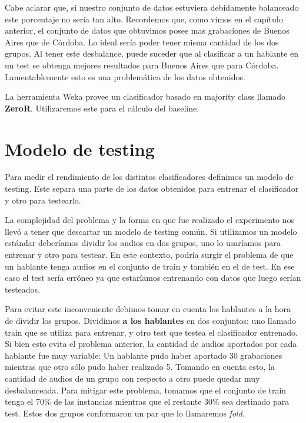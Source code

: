 Cabe aclarar que, si nuestro conjunto de datos estuviera debidamente balanceado este porcentaje no sería tan alto. Recordemos que, como vimos en el capítulo anterior, el conjunto de datos que obtuvimos posee mas grabaciones de Buenos Aires que de Córdoba. Lo ideal sería poder tener misma cantidad de los dos grupos. Al tener este desbalance, puede suceder que al clasificar a un hablante en un test se obtenga mejores resultados para Buenos Aires que para Córdoba. Lamentablemente esto es una problemática de los datos obtenidos.

La herramienta Weka provee un clasificador basado en majority class llamado \textbf{ZeroR}. Utilizaremos este para el cálculo del baseline. 

\section{Modelo de testing}

Para medir el rendimiento de los distintos clasificadores definimos un modelo de testing. Este separa una parte de los datos obtenidos para entrenar el clasificador y otro para testearlo.

La complejidad del problema y la forma en que fue realizado el experimento nos llevó a tener que descartar un modelo de testing común. Si utilizamos un modelo estándar deberíamos dividir los audios en dos grupos, uno lo usaríamos para entrenar y otro para testear. En este contexto, podría surgir el problema de que un hablante tenga audios en el conjunto de train y también en el de test. En ese caso el test sería erróneo ya que estaríamos entrenando con datos que luego serían testeados.

Para evitar este inconveniente debimos tomar en cuenta los hablantes a la hora de dividir los grupos. Dividimos \textbf{a los hablantes} en dos conjuntos: uno llamado train que se utiliza para entrenar, y otro test que testea el clasificador entrenado. Si bien esto evita el problema anterior, la cantidad de audios aportados por cada hablante fue muy variable: Un hablante pudo haber aportado 30 grabaciones mientras que otro sólo pudo haber realizado 5. Tomando en cuenta esto, la cantidad de audios de un grupo con respecto a otro puede quedar muy desbalanceada. Para mitigar este problema, tomamos que el conjunto de train tenga el 70\% de las instancias mientras que el restante 30\% sea destinado para test. Estos dos grupos conformaron un par que lo llamaremos \textit{fold}.


